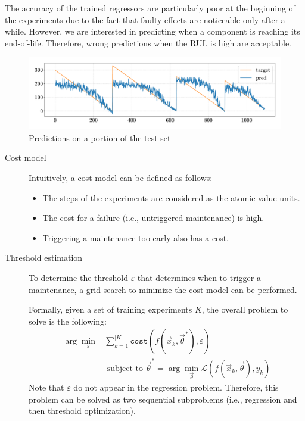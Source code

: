 \begin{remark}
    The accuracy of the trained regressors are particularly poor at the beginning of the experiments due to the fact that faulty effects are noticeable only after a while. However, we are interested in predicting when a component is reaching its end-of-life. Therefore, wrong predictions when the RUL is high are acceptable.
    \begin{figure}[H]
        \centering
        \includegraphics[width=0.7\linewidth]{./img/_rul_regression_predictions.pdf}
        \caption{Predictions on a portion of the test set}
    \end{figure}
\end{remark}

\begin{description}
    \item[Cost model] 
        Intuitively, a cost model can be defined as follows:
        \begin{itemize}
            \item The steps of the experiments are considered as the atomic value units.
            \item The cost for a failure (i.e., untriggered maintenance) is high.
            \item Triggering a maintenance too early also has a cost.
        \end{itemize}

    \item[Threshold estimation]
        To determine the threshold $\varepsilon$ that determines when to trigger a maintenance, a grid-search to minimize the cost model can be performed.

        Formally, given a set of training experiments $K$, the overall problem to solve is the following:
        \[
            \begin{split}
                \arg\min_{\varepsilon} &\sum_{k=1}^{|K|} \texttt{cost}(f(\vec{x}_k, \vec{\theta}^*), \varepsilon) \\
                &\text{ subject to } \vec{\theta}^* = \arg\min_\vec{\theta} \mathcal{L}(f(\vec{x}_k, \vec{\theta}), y_k)
            \end{split}
        \]
        Note that $\varepsilon$ do not appear in the regression problem. Therefore, this problem can be solved as two sequential subproblems (i.e., regression and then threshold optimization).
\end{description}


